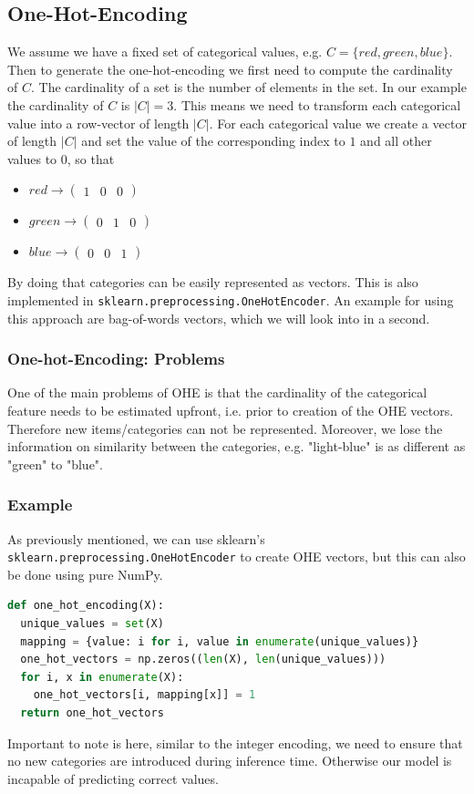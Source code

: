 \subsection{One-Hot-Encoding}
We assume we have a fixed set of categorical values, e.g. $C = \{red, green, blue\}$. Then to generate the one-hot-encoding we first need to compute the cardinality of $C$.
The cardinality of a set is the number of elements in the set. In our example the cardinality of $C$ is $|C| = 3$. This means we need to transform each categorical value into a row-vector of length $|C|$.
For each categorical value we create a vector of length $|C|$ and set the value of the corresponding index to $1$ and all other values to $0$, so that
\begin{itemize}
  \item $red \rightarrow \begin{pmatrix}1 & 0 & 0\end{pmatrix}$
  \item $green \rightarrow \begin{pmatrix}0 & 1 & 0\end{pmatrix}$
  \item $blue \rightarrow \begin{pmatrix}0 & 0 & 1\end{pmatrix}$
\end{itemize}
By doing that categories can be easily represented as vectors.
This is also implemented in \lstinline{sklearn.preprocessing.OneHotEncoder}.
An example for using this approach are bag-of-words vectors, which we will look into in a second.

\subsubsection{One-hot-Encoding: Problems}
One of the main problems of OHE is that the cardinality of the categorical feature needs to be estimated upfront, i.e. prior to creation of the OHE vectors.
Therefore new items/categories can not be represented. Moreover, we lose the information on similarity between the categories, e.g. "light-blue" is as different as "green" to "blue".
\subsubsection{Example}
As previously mentioned, we can use sklearn's \lstinline{sklearn.preprocessing.OneHotEncoder} to create OHE vectors, but this can also be done using pure NumPy.
\begin{lstlisting}[language=Python, caption={One-Hot-Encoding in NumPy}, label={code:one-hot-encoding}]
def one_hot_encoding(X):
  unique_values = set(X)
  mapping = {value: i for i, value in enumerate(unique_values)}
  one_hot_vectors = np.zeros((len(X), len(unique_values)))
  for i, x in enumerate(X):
    one_hot_vectors[i, mapping[x]] = 1
  return one_hot_vectors
\end{lstlisting}
Important to note is here, similar to the integer encoding, we need to ensure that no new categories are introduced during inference time. Otherwise our model is incapable of predicting correct values.



